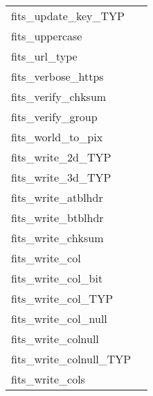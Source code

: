 \documentclass[11pt]{book}
\begin{document}
\begin{tabular}{lr}
fits\_update\_key\_TYP    & \pageref{ffukyx} \\
fits\_uppercase      & \pageref{ffupch} \\
fits\_url\_type      & \pageref{ffurlt} \\
fits\_verbose\_https  & \pageref{ffvhtps} \\
fits\_verify\_chksum  & \pageref{ffvcks} \\
fits\_verify\_group  & \pageref{ffgtvf} \\
fits\_world\_to\_pix & \pageref{ffxypx} \\
fits\_write\_2d\_TYP   & \pageref{ffp2dx} \\
fits\_write\_3d\_TYP   & \pageref{ffp3dx} \\
fits\_write\_atblhdr      & \pageref{ffphtb} \\
fits\_write\_btblhdr      & \pageref{ffphbn} \\
fits\_write\_chksum   & \pageref{ffpcks} \\
fits\_write\_col         & \pageref{ffpcl} \\
fits\_write\_col\_bit     & \pageref{ffpclx} \\
fits\_write\_col\_TYP     & \pageref{ffpcls} \\
fits\_write\_col\_null      & \pageref{ffpclu} \\
fits\_write\_colnull      & \pageref{ffpcn} \\
fits\_write\_colnull\_TYP & \pageref{ffpcnx} \\
fits\_write\_cols         & \pageref{ffpcln} \\
\end{tabular}
\newpage
\end{document}
